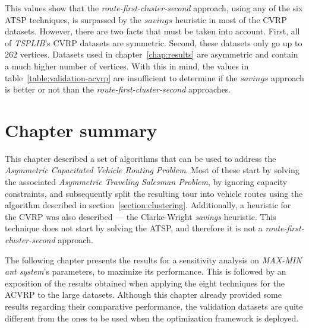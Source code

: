 This values show that the \textit{route-first-cluster-second} approach, using
any of the six ATSP techniques, is surpassed by the $savings$ heuristic in most
of the CVRP datasets. However, there are two facts that must be taken into
account. First, all of \textit{TSPLIB}'s CVRP datasets are symmetric. Second,
these datasets only go up to $262$ vertices. Datasets used in
chapter~\ref{chap:results} are asymmetric and contain a much higher number of
vertices. With this in mind, the values in table~\ref{table:validation-acvrp}
are insufficient to determine if the $savings$ approach is better or not than
the \textit{route-first-cluster-second} approaches.

\newpage




\section{Chapter summary}
\label{section:algorithms-summary}

This chapter described a set of algorithms that can be used to address the
\textit{Asymmetric Capacitated Vehicle Routing Problem}. Most of these start by
solving the associated \textit{Asymmetric Traveling Salesman Problem}, by
ignoring capacity constraints, and subsequently split the resulting tour into
vehicle routes using the algorithm described in
section~\ref{section:clustering}. Additionally, a heuristic for the CVRP was
also described --- the Clarke-Wright \textit{savings} heuristic. This technique
does not start by solving the ATSP, and therefore it is not a
\textit{route-first-cluster-second} approach.


The following chapter presents the results for a sensitivity analysis on
\textit{MAX-MIN ant system}'s parameters, to maximize its performance. This is
followed by an exposition of the results obtained when applying the eight
techniques for the ACVRP to the large datasets. Although this chapter already
provided some results regarding their comparative performance, the validation
datasets are quite different from the ones to be used when the optimization
framework is deployed.



